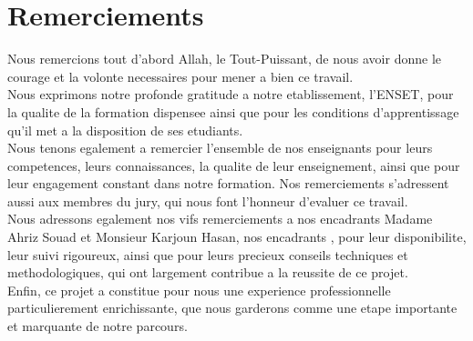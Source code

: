 \chapter*{Remerciements}

Nous remercions tout d'abord Allah, le Tout-Puissant, de nous avoir donne le
courage et la volonte necessaires pour mener a bien ce travail.\\

Nous exprimons notre profonde gratitude a notre etablissement, l'ENSET, pour la
qualite de la formation dispensee ainsi que pour les conditions d'apprentissage
qu'il met a la disposition de ses etudiants.\\

Nous tenons egalement a remercier l'ensemble de nos enseignants pour leurs
competences, leurs connaissances, la qualite de leur enseignement, ainsi que
pour leur engagement constant dans notre formation. Nos remerciements
s'adressent aussi aux membres du jury, qui nous font l'honneur d'evaluer ce
travail.\\

Nous adressons egalement nos vifs remerciements a nos encadrants  Madame Ahriz Souad et Monsieur Karjoun Hasan, nos
encadrants , pour leur disponibilite, leur suivi rigoureux, ainsi que pour
leurs precieux conseils techniques et methodologiques, qui ont largement contribue
a la reussite de ce projet.\\

Enfin, ce projet a constitue pour nous une experience professionnelle
particulierement enrichissante, que nous garderons comme une etape importante et
marquante de notre parcours.
